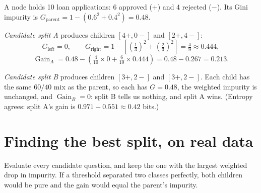 \begin{workedexample}
A node holds 10 loan applications: 6 approved ($+$) and 4 rejected ($-$). Its Gini impurity is
$G_{\text{parent}}=1-(0.6^2+0.4^2)=0.48$.

\emph{Candidate split A} produces children $[4+,0-]$ and $[2+,4-]$:
\[
  G_{\text{left}}=0,
  \qquad
  G_{\text{right}}=1-\left[{\left(\tfrac{1}{3}\right)}^2+{\left(\tfrac{2}{3}\right)}^2\right]=\tfrac{4}{9}\approx 0.444,
\]
\[
  \operatorname{Gain}_A
  =0.48-\left(\tfrac{4}{10}\times 0+\tfrac{6}{10}\times 0.444\right)
  =0.48-0.267=0.213.
\]

\emph{Candidate split B} produces children $[3+,2-]$ and $[3+,2-]$. Each child has the same $60/40$ mix as the parent, so each has $G=0.48$, the weighted impurity is unchanged, and $\operatorname{Gain}_B=0$: split B tells us nothing, and split A wins. (Entropy agrees: split A's gain is $0.971-0.551\approx 0.42$ bits.)
\end{workedexample}

\section{Finding the best split, on real data}

Evaluate every candidate question, and keep the one with the largest weighted drop in impurity. If a threshold separated two classes perfectly, both children would be pure and the gain would equal the parent's impurity.

